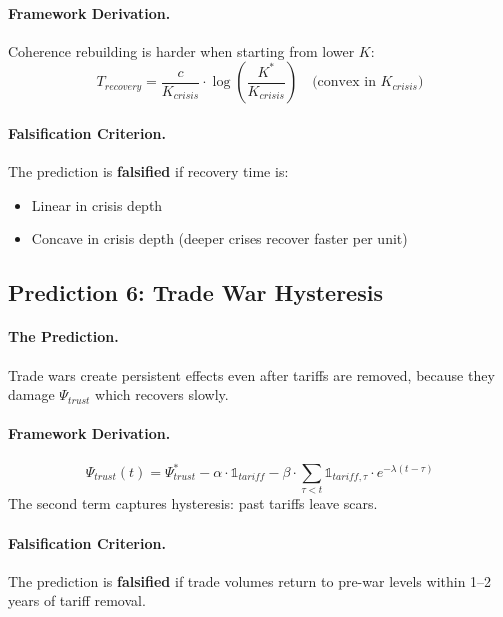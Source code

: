 \documentclass[12pt,a4paper]{article}
\begin{document}
\paragraph{Framework Derivation.}
Coherence rebuilding is harder when starting from lower $K$:
\begin{equation}
    T_{recovery} = \frac{c}{K_{crisis}} \cdot \log\left(\frac{K^*}{K_{crisis}}\right) \quad \text{(convex in } K_{crisis}\text{)}
\end{equation}

\paragraph{Falsification Criterion.}
The prediction is \textbf{falsified} if recovery time is:
\begin{itemize}
    \item Linear in crisis depth
    \item Concave in crisis depth (deeper crises recover faster per unit)
\end{itemize}

\subsection{Prediction 6: Trade War Hysteresis}

\paragraph{The Prediction.}
Trade wars create persistent effects even after tariffs are removed, because they damage $\Psi_{trust}$ which recovers slowly.

\paragraph{Framework Derivation.}
\begin{equation}
    \Psi_{trust}(t) = \Psi_{trust}^* - \alpha \cdot \mathbb{1}_{tariff} - \beta \cdot \sum_{\tau < t} \mathbb{1}_{tariff,\tau} \cdot e^{-\lambda(t-\tau)}
\end{equation}
The second term captures hysteresis: past tariffs leave scars.

\paragraph{Falsification Criterion.}
The prediction is \textbf{falsified} if trade volumes return to pre-war levels within 1--2 years of tariff removal.
\end{document}
